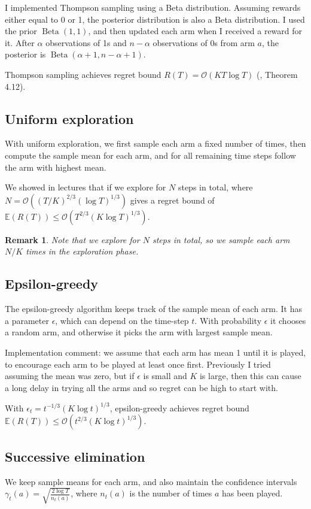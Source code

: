 \documentclass[10pt]{article}
\newtheorem{remark}{Remark}
\newcommand{\EE}{\mathbb{E}}
\newcommand{\bigoh}{\mathcal{O}}
\DeclareMathOperator{\Beta}{Beta}
\begin{document}
I implemented Thompson sampling using a Beta distribution. Assuming rewards
either equal to 0 or 1, the posterior distribution is also a Beta distribution.
I used the prior $\Beta(1,1)$, and then updated each arm when I received a reward
for it. After $\alpha$ observations of 1s and $n - \alpha$ observations of 0s
from arm $a$, the posterior is $\Beta(\alpha + 1, n - \alpha + 1)$.

Thompson sampling achieves regret bound $R(T) = \bigoh(KT \log T)$
(\cite{Slivkins}, Theorem 4.12).

\subsection{Uniform exploration}
With uniform exploration, we first sample each arm a fixed number of times, then
compute the sample mean for each arm, and for all remaining time steps follow
the arm with highest mean.

We showed in lectures that if we explore for $N$ steps in total, where $N =
\bigoh((T/K)^{2/3} (\log T)^{1/3} )$ gives a regret bound of $\EE(R(T)) \le
\bigoh(T^{2/3} (K \log T)^{1/3})$.

\begin{remark}
    Note that we explore for $N$ steps in total, so we sample each arm $N / K$
    times in the exploration phase.
\end{remark}

\subsection{Epsilon-greedy}

The epsilon-greedy algorithm keeps track of the sample mean of each arm. It has
a parameter $\epsilon$, which can depend on the time-step $t$. With probability
$\epsilon$ it chooses a random arm, and otherwise it picks the arm with largest
sample mean.

Implementation comment: we assume that each arm has mean 1 until it is played,
to encourage each arm to be played at least once first. Previously I tried
assuming the mean was zero, but if $\epsilon$ is small and $K$ is large, then
this can cause a long delay in trying all the arms and so regret can be high to
start with.

With $\epsilon_t = t^{-1/3} (K \log t)^{1/3}$, epsilon-greedy achieves regret
bound $\EE(R(T)) \le \bigoh( t^{2/3} (K \log t)^{1/3} )$.

\subsection{Successive elimination}
We keep sample means for each arm, and also maintain the confidence intervals
$\gamma_t(a) = \sqrt{\frac{2 \log T}{n_t(a)}}$, where $n_t(a)$ is the number of
times $a$ has been played.
\end{document}
